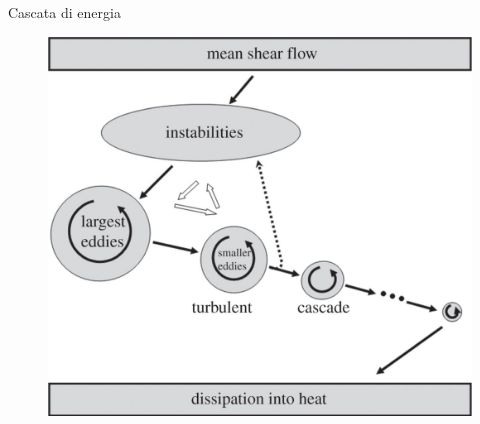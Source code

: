 \documentclass[11pt]{beamer}
\begin{document}
\begin{frame}{Cascata di energia}
\begin{figure}
\centering
\includegraphics[scale=0.65]{large.jpg}
\end{figure}
\end{frame}
\end{document}
